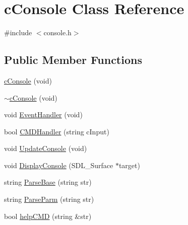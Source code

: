 \hypertarget{classc_console}{\section{c\-Console Class Reference}
\label{classc_console}
}


{\ttfamily \#include $<$console.\-h$>$}

\subsection*{Public Member Functions}
\begin{DoxyCompactItemize}
\item 
\hyperlink{classc_console_a30b719f98df2be1670f6e4e1055844a5}{c\-Console} (void)
\item 
\hyperlink{classc_console_a04db145731451de6c1d2f8a722a2ba39}{$\sim$c\-Console} (void)
\item 
void \hyperlink{classc_console_ac529f81ae976f1c09e8a8b76a4a70da0}{Event\-Handler} (void)
\item 
bool \hyperlink{classc_console_a2af219624286a76eae3ef8830d456b21}{C\-M\-D\-Handler} (string c\-Input)
\item 
void \hyperlink{classc_console_a35b883f33dfc51b67ef1608daba2c873}{Update\-Console} (void)
\item 
void \hyperlink{classc_console_a8f3be2e46f6cc75c9ac8eaf7feb80a57}{Display\-Console} (S\-D\-L\-\_\-\-Surface $\ast$target)
\item 
string \hyperlink{classc_console_a7a7d0194d1e22ab68f6845f5cb6dd100}{Parse\-Base} (string str)
\item 
string \hyperlink{classc_console_a171d84d3f5e6e53bd88aacffb7b6e767}{Parse\-Parm} (string str)
\item 
bool \hyperlink{classc_console_a1c14f1fb79757dd36d883db2e095ae2a}{help\-C\-M\-D} (string \&str)
\end{DoxyCompactItemize}
